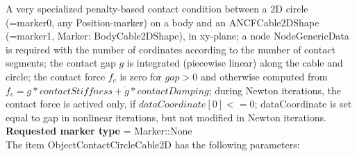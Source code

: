 A very specialized penalty-based contact condition between a 2D circle (=marker0, any Position-marker) on a body and an ANCFCable2DShape (=marker1, Marker: BodyCable2DShape), in xy-plane; a node NodeGenericData is required with the number of cordinates according to the number of contact segments; the contact gap $g$ is integrated (piecewise linear) along the cable and circle; the contact force $f_c$ is zero for $gap>0$ and otherwise computed from $f_c = g*contactStiffness + \dot g*contactDamping$; during Newton iterations, the contact force is actived only, if $dataCoordinate[0] <= 0$; dataCoordinate is set equal to gap in nonlinear iterations, but not modified in Newton iterations.
 \\  {\bf Requested marker type} = Marker::None \\ 
The item ObjectContactCircleCable2D has the following parameters:
